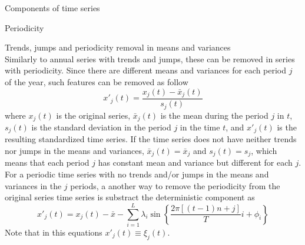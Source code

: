\documentclass[8pt]{beamer}
\renewcommand{\emph}[1]{\textcolor{myorange}{#1}}
\begin{document}
\begin{frame}{Components of time series}
    \begin{block}{Periodicity}
    \end{block}
    \alert{Trends, jumps and periodicity removal in means and variances}\\

    Similarly to annual series with \emph{trends} and \emph{jumps}, these can be removed in series with periodicity. Since there are different \emph{means} and \emph{variances} for each period $j$ of the year, such features can be removed as follow
    \[
        x'_j (t) = \frac{x_j(t)-\bar{x}_j (t)}{s_j (t)}
    \]
    where $x_j (t)$ is the original series, $\bar{x}_j (t)$ is the \emph{mean} during the period $j$ in $t$, $s_j (t)$ is the \emph{standard deviation} in the period $j$ in the time $t$, and $x'_j (t)$ is the resulting standardized time series. If the time series does not have neither \emph{trends} nor \emph{jumps} in the \emph{means} and \emph{variances}, $\bar{x}_j (t) =\bar{x}_j$ and $s_j (t) = s_j$, which means that each period $j$ has constant \emph{mean} and \emph{variance} but different for each $j$. 
    For a \emph{periodic} time series with no \emph{trends} and/or \emph{jumps} in the \emph{means} and \emph{variances} in the $j$ periods, a another way to remove the \emph{periodicity}  from the original series time series is substract the deterministic component as 
    \[
        x'_j (t) = x_j (t) - \bar{x} - \sum_{i=1}^L \lambda_i \sin\left\{\frac{2\pi\left[(t-1)n + j\right]}{T} i + \phi_i \right\} 
    \]
    Note that in this equations $x'_j (t) \equiv \xi_j (t)$.

\end{frame}
\end{document}

